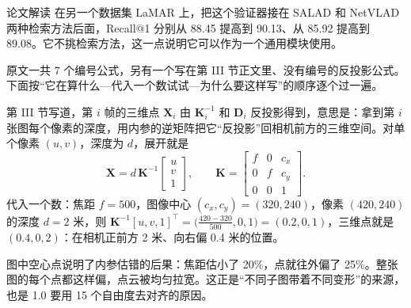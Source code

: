 \begin{interp}{论文解读}
在另一个数据集 LaMAR 上，把这个验证器接在 SALAD 和 NetVLAD 两种检索方法后面，Recall@1 分别从 88.45 提高到 90.13、从 85.92 提高到 89.08。它不挑检索方法，这一点说明它可以作为一个通用模块使用。


原文一共 7 个编号公式，另有一个写在第 III 节正文里、没有编号的反投影公式。下面按“它在算什么—代入一个数试试—为什么要这样写”的顺序逐个过一遍。


第 III 节写道，第 $i$ 帧的三维点 $\mathbf{X}_i$ 由 $\mathbf{K}_i^{-1}$ 和 $\mathbf{D}_i$ 反投影得到，意思是：拿到第 $i$ 张图每个像素的深度，用内参的逆矩阵把它“反投影”回相机前方的三维空间。对单个像素 $(u,v)$，深度为 $d$，展开就是
\[ \mathbf{X}=d\,\mathbf{K}^{-1}\begin{bmatrix}u\\ v\\ 1\end{bmatrix},\qquad
\mathbf{K}=\begin{bmatrix}f&0&c_x\\ 0&f&c_y\\ 0&0&1\end{bmatrix}. \]
代入一个数：焦距 $f=500$，图像中心 $(c_x,c_y)=(320,240)$，像素 $(420,240)$ 的深度 $d=2$ 米，则 $\mathbf{K}^{-1}[u,v,1]^\top=\big(\tfrac{420-320}{500},0,1\big)=(0.2,0,1)$，三维点就是 $(0.4,0,2)$：在相机正前方 2 米、向右偏 0.4 米的位置。

\begin{center}
\end{center}

图中空心点说明了内参估错的后果：焦距估小了 20\%，点就往外偏了 25\%。整张图的每个点都这样偏，点云被均匀拉宽。这正是“不同子图带着不同变形”的来源，也是 1.0 要用 15 个自由度去对齐的原因。


\end{interp}
